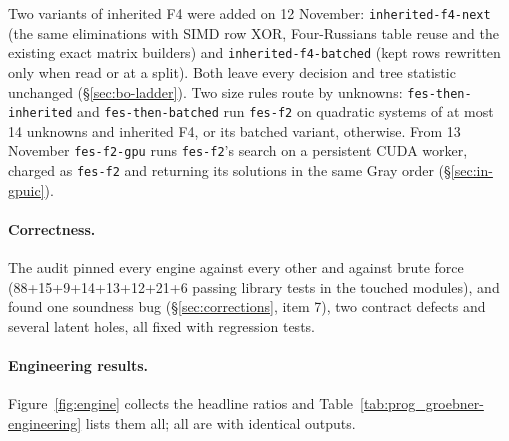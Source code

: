 Two variants of inherited F4 were added on 12 November: \texttt{inherited-f4-next}
(the same eliminations with SIMD row XOR, Four-Russians table reuse and
the existing exact matrix builders) and \texttt{inherited-f4-batched}
(kept rows rewritten only when read or at a split). Both leave every
decision and tree statistic unchanged (\S\ref{sec:bo-ladder}). Two size
rules route by unknowns: \texttt{fes-then-inherited} and
\texttt{fes-then-batched} run \texttt{fes-f2} on quadratic systems of at
most 14 unknowns and inherited F4, or its batched variant, otherwise. From
13 November \texttt{fes-f2-gpu} runs \texttt{fes-f2}'s search on a
persistent CUDA worker, charged as \texttt{fes-f2} and returning its
solutions in the same Gray order (\S\ref{sec:in-gpuic}).

\paragraph{Correctness.} The audit pinned every engine against every
other and against brute force (88+15+9+14+13+12+21+6 passing library
tests in the touched modules), and found one soundness bug
(\S\ref{sec:corrections}, item 7), two contract defects and several latent
holes, all fixed with regression tests.

\paragraph{Engineering results.} Figure~\ref{fig:engine} collects the
headline ratios and Table~\ref{tab:prog_groebner-engineering} lists them
all; all are  with identical outputs.

